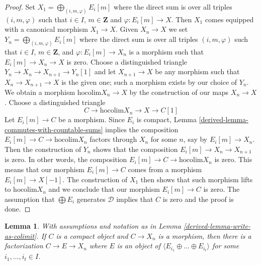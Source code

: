 \documentclass{amsart}
\theoremstyle{plain}
\newtheorem{lemma}[subsection]{Lemma}
\theoremstyle{definition}
\theoremstyle{remark}
\numberwithin{equation}{subsection}
\begin{document}
\begin{proof}
Set $X_1 = \bigoplus_{(i, m, \varphi)} E_i[m]$ where the direct sum is over
all triples $(i, m, \varphi)$ such that $i \in I$, $m \in \mathbf{Z}$
and $\varphi : E_i[m] \to X$. Then $X_1$ comes equipped with a canonical
morphism $X_1 \to X$. Given $X_n \to X$ we set
$Y_n = \bigoplus_{(i, m, \varphi)} E_i[m]$ where the direct sum is over
all triples $(i, m, \varphi)$ such that $i \in I$, $m \in \mathbf{Z}$, and
$\varphi : E_i[m] \to X_n$ is a morphism such that $E_i[m] \to X_n \to X$
is zero. Choose a distinguished triangle
$Y_n \to X_n \to X_{n + 1} \to Y_n[1]$
and let $X_{n + 1} \to X$ be any morphism such that $X_n \to X_{n + 1} \to X$
is the given one; such a morphism exists by our choice of $Y_n$.
We obtain a morphism $\text{hocolim} X_n \to X$ by the construction
of our maps $X_n \to X$. Choose a distinguished triangle
$$
C \to \text{hocolim} X_n \to X \to C[1]
$$
Let $E_i[m] \to C$ be a morphism. Since $E_i$ is compact,
Lemma \ref{derived-lemma-commutes-with-countable-sums}
implies the composition $E_i[m] \to C \to \text{hocolim} X_n$ factors through
$X_n$ for some $n$, say by $E_i[m] \to X_n$. Then the
construction of $Y_n$ shows that the composition
$E_i[m] \to X_n \to X_{n + 1}$ is zero. In other words, the composition
$E_i[m] \to C \to \text{hocolim} X_n$ is zero. This means that our
morphism $E_i[m] \to C$ comes from a morphism $E_i[m] \to X[-1]$.
The construction of $X_1$ then shows that such morphism lifts to
$\text{hocolim} X_n$ and we conclude that our morphism $E_i[m] \to C$
is zero. The assumption that $\bigoplus E_i$ generates $\mathcal{D}$
implies that $C$ is zero and the proof is done.
\end{proof}


\begin{lemma}
\label{derived-lemma-factor-through}
With assumptions and notation as in Lemma \ref{derived-lemma-write-as-colimit}.
If $C$ is a compact object and $C \to X_n$ is a morphism, then
there is a factorization $C \to E \to X_n$ where
$E$ is an object of $\langle E_{i_1} \oplus \ldots \oplus E_{i_t} \rangle$
for some $i_1, \ldots, i_t \in I$.
\end{lemma}
\end{document}
